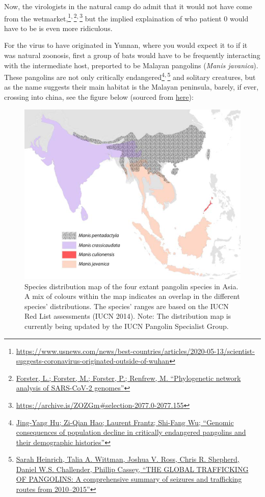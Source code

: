 \documentclass[11pt]{article}
\begin{document}
Now, the virologists in the natural camp do admit that it would not have come from the wetmarket,\footnote{\url{https://www.usnews.com/news/best-countries/articles/2020-05-13/scientist-suggests-coronavirus-originated-outside-of-wuhan}}\textsuperscript{,}\,\footnote{\href{https://www.pnas.org/content/117/17/9241}{Forster, L.; Forster, M.; Forster, P.; Renfrew, M. ``Phylogenetic network analysis of SARS-CoV-2 genomes''}}\textsuperscript{,}\,\footnote{\url{https://archive.is/ZOZGm\#selection-2077.0-2077.155}} but the implied explaination of who patient 0 would have to be is even more ridiculous.

For the virus to have originated in Yunnan, where you would expect it to if it was natural zoonosis, first a group of bats would have to be frequently interacting with the intermediate host, preported to be Malayan pangolins (\emph{Manis javanica}). These pangolins are not only critically endangered\footnote{\href{https://www.researchgate.net/publication/344073744\_Genomic\_consequences\_of\_population\_decline\_in\_critically\_endangered\_pangolins\_and\_their\_demographic\_histories}{Jing-Yang Hu; Zi-Qian Hao; Laurent Frantz; Shi-Fang Wu; ``Genomic consequences of population decline in critically endangered pangolins and their demographic histories''}}\textsuperscript{,}\,\footnote{\href{https://www.traffic.org/site/assets/files/1606/global-pangolin-assessment.pdf}{Sarah Heinrich, Talia A. Wittman, Joshua V. Ross, Chris R. Shepherd, Daniel W.S. Challender, Phillip Cassey, ``THE GLOBAL TRAFFICKING OF PANGOLINS: A comprehensive summary of seizures and trafficking routes from 2010–2015''}} and solitary creatures, but as the name suggests their main habitat is the Malayan peninsula, barely, if ever, crossing into china, see the figure below (sourced from \href{https://www.traffic.org/site/assets/files/1606/global-pangolin-assessment.pdf}{here}):
\begin{figure}[htbp]
\centering
\includegraphics[width=.9\linewidth]{./images/pangolin-habitat.png}
\caption{Species distribution map of the four extant pangolin species in Asia. A mix of colours within the map indicates an overlap in the different species’ distributions.  The species’ ranges are based on the IUCN Red List assessments (IUCN 2014). Note: The distribution map is currently being updated by the IUCN Pangolin Specialist Group.}
\end{figure}
\end{document}
